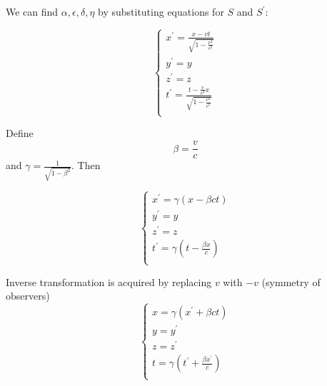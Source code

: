 We can find $\alpha, \epsilon, \delta, \eta$ by substituting equations for $S$ and $S^\prime$:

$$\begin{cases*}
x^\prime = \frac{x-vt}{\sqrt{1-\frac{v^2}{c^2}}}\\
y^\prime = y\\
z^\prime = z\\
t^\prime = \frac{t-\frac{v}{c^2}x}{\sqrt{1-\frac{v^2}{c^2}}}\\
\end{cases*}$$

Define $$\beta = \frac{v}{c}$$ and $\gamma = \frac{1}{\sqrt{1-\beta^2}}$. Then

$$\begin{cases*}
x^\prime = \gamma \left(x-\beta ct\right)\\
y^\prime = y\\
z^\prime = z\\
t^\prime = \gamma \left( t - \frac{\beta x}{c} \right)\\
\end{cases*}$$

Inverse transformation is acquired by replacing $v$ with $-v$ (symmetry of observers)
$$\begin{cases*}
x = \gamma \left(x^\prime+\beta ct\right)\\
y = y^\prime\\
z = z^\prime\\
t = \gamma \left( t^\prime + \frac{\beta x^\prime}{c} \right)\\
\end{cases*}$$